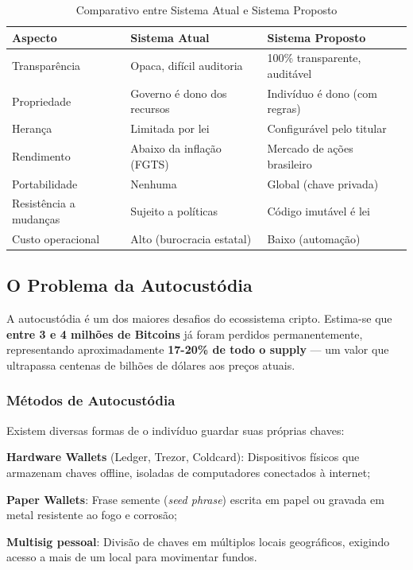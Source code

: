 \begin{table}[htb]
    \centering
    \caption{Comparativo entre Sistema Atual e Sistema Proposto}
    \label{tab:comparativo-sistemas}
    \begin{tabular}{p{3.5cm}p{4.5cm}p{4.5cm}}
        \toprule
        \textbf{Aspecto} & \textbf{Sistema Atual} & \textbf{Sistema Proposto} \\
        \midrule
        Transparência & Opaca, difícil auditoria & 100\% transparente, auditável \\
        Propriedade & Governo é dono dos recursos & Indivíduo é dono (com regras) \\
        Herança & Limitada por lei & Configurável pelo titular \\
        Rendimento & Abaixo da inflação (FGTS) & Mercado de ações brasileiro \\
        Portabilidade & Nenhuma & Global (chave privada) \\
        Resistência a mudanças & Sujeito a políticas & Código imutável é lei \\
        Custo operacional & Alto (burocracia estatal) & Baixo (automação) \\
        \bottomrule
    \end{tabular}
\end{table}

\subsection{O Problema da Autocustódia}

A autocustódia é um dos maiores desafios do ecossistema cripto. Estima-se que \textbf{entre 3 e 4 milhões de Bitcoins} já foram perdidos permanentemente, representando aproximadamente \textbf{17-20\% de todo o supply} --- um valor que ultrapassa centenas de bilhões de dólares aos preços atuais.

\subsubsection{Métodos de Autocustódia}

Existem diversas formas de o indivíduo guardar suas próprias chaves:

\begin{alineas}
    \item \textbf{Hardware Wallets} (Ledger, Trezor, Coldcard): Dispositivos físicos que armazenam chaves offline, isoladas de computadores conectados à internet;
    \item \textbf{Paper Wallets}: Frase semente (\textit{seed phrase}) escrita em papel ou gravada em metal resistente ao fogo e corrosão;
    \item \textbf{Multisig pessoal}: Divisão de chaves em múltiplos locais geográficos, exigindo acesso a mais de um local para movimentar fundos.
\end{alineas}


